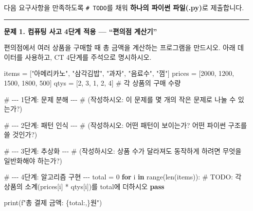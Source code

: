 \documentclass[
  korean,
  11pt,
  a4paper,
  DIV=11,
  numbers=noendperiod]{scrreprt}
\newenvironment{Shaded}{\begin{snugshade}}{\end{snugshade}}
\newcommand{\AlertTok}[1]{\textcolor[rgb]{0.68,0.00,0.00}{#1}}
\newcommand{\BuiltInTok}[1]{\textcolor[rgb]{0.00,0.23,0.31}{#1}}
\newcommand{\CommentTok}[1]{\textcolor[rgb]{0.37,0.37,0.37}{#1}}
\newcommand{\ControlFlowTok}[1]{\textcolor[rgb]{0.00,0.23,0.31}{\textbf{#1}}}
\newcommand{\DecValTok}[1]{\textcolor[rgb]{0.68,0.00,0.00}{#1}}
\newcommand{\KeywordTok}[1]{\textcolor[rgb]{0.00,0.23,0.31}{\textbf{#1}}}
\newcommand{\NormalTok}[1]{\textcolor[rgb]{0.00,0.23,0.31}{#1}}
\newcommand{\OperatorTok}[1]{\textcolor[rgb]{0.37,0.37,0.37}{#1}}
\newcommand{\SpecialCharTok}[1]{\textcolor[rgb]{0.37,0.37,0.37}{#1}}
\newcommand{\SpecialStringTok}[1]{\textcolor[rgb]{0.13,0.47,0.30}{#1}}
\newcommand{\StringTok}[1]{\textcolor[rgb]{0.13,0.47,0.30}{#1}}
\begin{document}
다음 요구사항을 만족하도록 \texttt{\#\ TODO}를 채워 \textbf{하나의
파이썬 파일(.py)}로 제출합니다.

\begin{center}\rule{0.5\linewidth}{0.5pt}\end{center}

\textbf{문제 1. 컴퓨팅 사고 4단계 적용 --- ``편의점 계산기''}

편의점에서 여러 상품을 구매할 때 총 금액을 계산하는 프로그램을 만드시오.
아래 데이터를 사용하고, CT 4단계를 주석으로 명시하시오.

\begin{Shaded}
\begin{Highlighting}[]
\NormalTok{items  }\OperatorTok{=}\NormalTok{ [}\StringTok{"아메리카노"}\NormalTok{, }\StringTok{"삼각김밥"}\NormalTok{, }\StringTok{"과자"}\NormalTok{, }\StringTok{"음료수"}\NormalTok{, }\StringTok{"껌"}\NormalTok{]}
\NormalTok{prices }\OperatorTok{=}\NormalTok{ [}\DecValTok{2000}\NormalTok{, }\DecValTok{1200}\NormalTok{, }\DecValTok{1500}\NormalTok{, }\DecValTok{1800}\NormalTok{, }\DecValTok{500}\NormalTok{]}
\NormalTok{qtys   }\OperatorTok{=}\NormalTok{ [}\DecValTok{2}\NormalTok{, }\DecValTok{3}\NormalTok{, }\DecValTok{1}\NormalTok{, }\DecValTok{2}\NormalTok{, }\DecValTok{4}\NormalTok{]   }\CommentTok{\# 각 상품의 구매 수량}

\CommentTok{\# {-}{-}{-} 1단계: 문제 분해 {-}{-}{-}}
\CommentTok{\# (작성하시오: 이 문제를 몇 개의 작은 문제로 나눌 수 있는가?)}

\CommentTok{\# {-}{-}{-} 2단계: 패턴 인식 {-}{-}{-}}
\CommentTok{\# (작성하시오: 어떤 패턴이 보이는가? 어떤 파이썬 구조를 쓸 것인가?)}

\CommentTok{\# {-}{-}{-} 3단계: 추상화 {-}{-}{-}}
\CommentTok{\# (작성하시오: 상품 수가 달라져도 동작하게 하려면 무엇을 일반화해야 하는가?)}

\CommentTok{\# {-}{-}{-} 4단계: 알고리즘 구현 {-}{-}{-}}
\NormalTok{total }\OperatorTok{=} \DecValTok{0}
\ControlFlowTok{for}\NormalTok{ i }\KeywordTok{in} \BuiltInTok{range}\NormalTok{(}\BuiltInTok{len}\NormalTok{(items)):}
    \CommentTok{\# }\AlertTok{TODO}\CommentTok{: 각 상품의 소계(prices[i] * qtys[i])를 total에 더하시오}
    \ControlFlowTok{pass}

\BuiltInTok{print}\NormalTok{(}\SpecialStringTok{f"총 결제 금액: }\SpecialCharTok{\{}\NormalTok{total}\SpecialCharTok{:,\}}\SpecialStringTok{원"}\NormalTok{)}
\end{Highlighting}
\end{Shaded}
\end{document}
